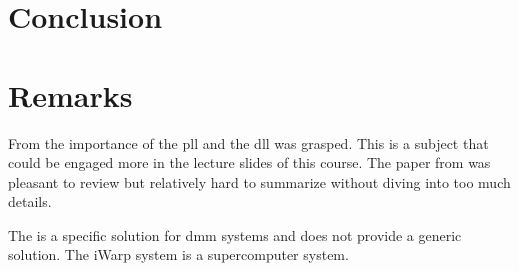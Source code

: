 \section{Conclusion} \label{sec:conclusion}





\section{Remarks}
From \cite{agrawal20098} the importance of the \ac{pll} and the \ac{dll} was grasped. 
This is a subject that could be engaged more in the lecture slides of this course.
The paper from \cite{agrawal20098} was pleasant to review but relatively hard to summarize without diving into too much details.

The \cite{steenkiste1997high} is a specific solution for \ac{dmm} systems and does not provide a generic solution. The iWarp system is a supercomputer system.